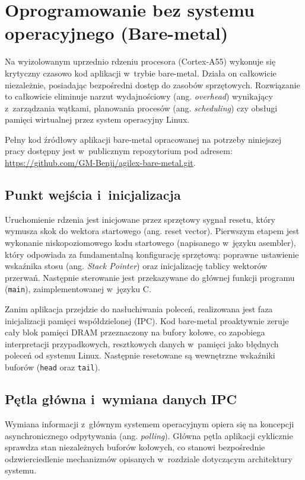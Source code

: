 \chapter{Oprogramowanie bez systemu operacyjnego (Bare-metal)}
\label{ch:bare_metal}

Na wyizolowanym uprzednio rdzeniu procesora (Cortex-A55) wykonuje się krytyczny czasowo kod aplikacji w~trybie bare-metal. Działa on całkowicie niezależnie, posiadając bezpośredni dostęp do zasobów sprzętowych. Rozwiązanie to całkowicie eliminuje narzut wydajnościowy (ang. \textit{overhead}) wynikający z~zarządzania wątkami, planowania procesów (ang. \textit{scheduling}) czy obsługi pamięci wirtualnej przez system operacyjny Linux.

Pełny kod źródłowy aplikacji bare-metal opracowanej na potrzeby niniejszej pracy dostępny jest w~publicznym repozytorium pod adresem: \url{https://github.com/GM-Benji/agilex-bare-metal.git}.

\section{Punkt wejścia i~inicjalizacja}
Uruchomienie rdzenia jest inicjowane przez sprzętowy sygnał resetu, który wymusza skok do wektora startowego (ang. reset vector). Pierwszym etapem jest wykonanie niskopoziomowego kodu startowego (napisanego w~języku asembler), który odpowiada za fundamentalną konfigurację sprzętową: poprawne ustawienie wskaźnika stosu (ang. \textit{Stack Pointer}) oraz inicjalizację tablicy wektorów przerwań. Następnie sterowanie jest przekazywane do głównej funkcji programu (\texttt{main}), zaimplementowanej w~języku C.

Zanim aplikacja przejdzie do nasłuchiwania poleceń, realizowana jest faza inicjalizacji pamięci współdzielonej (IPC). Kod bare-metal proaktywnie zeruje cały blok pamięci DRAM przeznaczony na bufory kołowe, co zapobiega interpretacji przypadkowych, resztkowych danych w~pamięci jako błędnych poleceń od systemu Linux. Następnie resetowane są wewnętrzne wskaźniki buforów (\texttt{head} oraz \texttt{tail}).

\section{Pętla główna i~wymiana danych IPC}
Wymiana informacji z~głównym systemem operacyjnym opiera się na koncepcji asynchronicznego odpytywania (ang. \textit{polling}). Główna pętla aplikacji cyklicznie sprawdza stan niezależnych buforów kołowych, co stanowi bezpośrednie odzwierciedlenie mechanizmów opisanych w~rozdziale dotyczącym architektury systemu.

